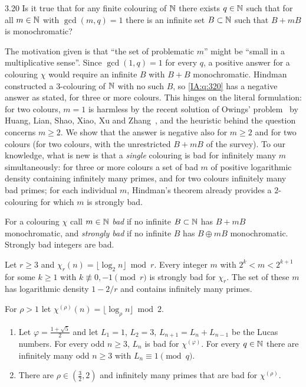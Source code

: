 \begin{question}{3.20}\label{IA:q:320}
Is it true that for any finite colouring of $\mathbb{N}$ there exists $q\in\mathbb{N}$ such that for all $m\in\mathbb{N}$
with $\gcd(m,q)=1$ there is an infinite set $B\subset\mathbb{N}$ such that $B+mB$ is monochromatic?
\end{question}

The motivation given is that ``the set of problematic $m$'' might be ``small in a multiplicative
sense''. Since $\gcd(1,q)=1$ for every $q$, a positive answer for a colouring $\chi$ would require an
infinite $B$ with $B+B$ monochromatic. Hindman~\cite[Theorem~2.4]{hindman1979partitions} constructed
a $3$-colouring of $\mathbb{N}$ with no such $B$, so \cref{IA:q:320} has a negative answer as stated, for
three or more colours. This hinges on the literal formulation: for two colours, $m=1$ is harmless by
the recent solution of Owings' problem~\cite{owings1974problem} by Huang, Lian, Shao, Xiao, Xu and
Zhang~\cite[Theorem~1.1]{huang2026affirmative}, and the heuristic behind the question concerns
$m\ge2$. We show that the answer is negative also for $m\ge2$ and for two colours (for two colours,
with the unrestricted $B+mB$ of the survey). To our knowledge, what is new is that a \emph{single} colouring is bad for
infinitely many $m$ simultaneously: for three or more colours a set of bad $m$ of positive
logarithmic density containing infinitely many primes, and for two colours infinitely many bad
primes; for each individual $m$, Hindman's theorem already provides a $2$-colouring for which $m$ is
strongly bad.

For a colouring $\chi$ call $m\in\mathbb{N}$ \emph{bad} if no infinite $B\subset\mathbb{N}$ has $B+mB$
monochromatic, and \emph{strongly bad} if no infinite $B$ has $B\oplus mB$ monochromatic.
Strongly bad integers are bad.

\begin{theorem}\label{IA:thm:320A}
Let $r\ge3$ and $\chi_r(n)=\lfloor\log_2n\rfloor\bmod r$. Every integer $m$ with $2^k<m<2^{k+1}$ for
some $k\ge1$ with $k\not\equiv0,-1\pmod r$ is strongly bad for $\chi_r$. The set of these $m$ has
logarithmic density $1-2/r$ and contains infinitely many primes.
\end{theorem}

\begin{theorem}\label{IA:thm:320B}
For $\rho>1$ let $\chi^{(\rho)}(n)=\lfloor\log_\rho n\rfloor\bmod 2$.
\begin{enumerate}[label=\textup{(\roman*)}]
\item\label{IA:it:lucas} Let $\varphi=\frac{1+\sqrt5}2$ and let $L_1=1$, $L_2=3$,
$L_{n+1}=L_n+L_{n-1}$ be the Lucas numbers. For every odd $n\ge3$, $L_n$ is bad for
$\chi^{(\varphi)}$. For every $q\in\mathbb{N}$ there are infinitely many odd $n\ge3$ with
$L_n\equiv1\pmod q$.
\item\label{IA:it:primes} There are $\rho\in(\frac32,2)$ and infinitely many primes that are bad for
$\chi^{(\rho)}$.
\end{enumerate}
\end{theorem}

